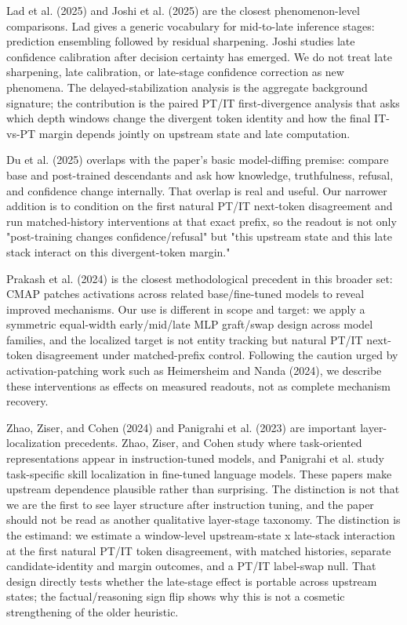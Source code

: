 \documentclass[11pt]{article}
\begin{document}
Lad et al. (2025) and Joshi et al. (2025) are the closest phenomenon-level comparisons. Lad gives a generic vocabulary for mid-to-late inference stages: prediction ensembling followed by residual sharpening. Joshi studies late confidence calibration after decision certainty has emerged. We do not treat late sharpening, late calibration, or late-stage confidence correction as new phenomena. The delayed-stabilization analysis is the aggregate background signature; the contribution is the paired PT/IT first-divergence analysis that asks which depth windows change the divergent token identity and how the final IT-vs-PT margin depends jointly on upstream state and late computation.

Du et al. (2025) overlaps with the paper's basic model-diffing premise: compare base and post-trained descendants and ask how knowledge, truthfulness, refusal, and confidence change internally. That overlap is real and useful. Our narrower addition is to condition on the first natural PT/IT next-token disagreement and run matched-history interventions at that exact prefix, so the readout is not only "post-training changes confidence/refusal" but "this upstream state and this late stack interact on this divergent-token margin."

Prakash et al. (2024) is the closest methodological precedent in this broader set: CMAP patches activations across related base/fine-tuned models to reveal improved mechanisms. Our use is different in scope and target: we apply a symmetric equal-width early/mid/late MLP graft/swap design across model families, and the localized target is not entity tracking but natural PT/IT next-token disagreement under matched-prefix control. Following the caution urged by activation-patching work such as Heimersheim and Nanda (2024), we describe these interventions as effects on measured readouts, not as complete mechanism recovery.

Zhao, Ziser, and Cohen (2024) and Panigrahi et al. (2023) are important layer-localization precedents. Zhao, Ziser, and Cohen study where task-oriented representations appear in instruction-tuned models, and Panigrahi et al. study task-specific skill localization in fine-tuned language models. These papers make upstream dependence plausible rather than surprising. The distinction is not that we are the first to see layer structure after instruction tuning, and the paper should not be read as another qualitative layer-stage taxonomy. The distinction is the estimand: we estimate a window-level upstream-state x late-stack interaction at the first natural PT/IT token disagreement, with matched histories, separate candidate-identity and margin outcomes, and a PT/IT label-swap null. That design directly tests whether the late-stage effect is portable across upstream states; the factual/reasoning sign flip shows why this is not a cosmetic strengthening of the older heuristic.
\end{document}
